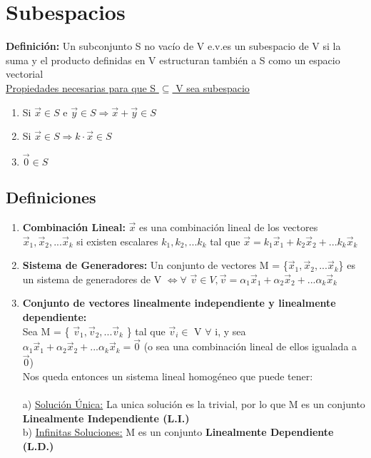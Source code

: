 \documentclass{article}
\begin{document}
\section{Subespacios} 
{\bfseries Definición:} Un subconjunto S no vacío de V e.v.es un subespacio de V si la suma y el producto definidas en  V estructuran también a S como un espacio vectorial \\
\underline {Propiedades necesarias para que S $\subseteq$ V sea subespacio}
\begin{enumerate}
\item Si $\vec{x} \in S$ e $\vec{y} \in S \Rightarrow \vec{x} + \vec{y} \in S$
\item Si $\vec{x} \in S \Rightarrow k \cdot \vec{x} \in S$
\item $\vec{0} \in S$
\end{enumerate}
\subsection{Definiciones}
\begin{enumerate}
\item {\bfseries Combinación Lineal:} $\vec{x}$ es una combinación lineal de los vectores $\vec{x}_{1}, \vec{x}_2,... \vec{x}_k $ si existen escalares $k_{1}, k_{2},... k_{k} $ tal que $\vec{x} = k_{1}\vec{x}_{1} + k_{2}\vec{x}_{2} +... k_{k}\vec{x}_{k}$
\item {\bfseries Sistema de Generadores:} Un conjunto de vectores M = \{$\vec{x}_{1}, \vec{x}_2,... \vec{x}_k $\} es un sistema de generadores de V $\Leftrightarrow \forall $ $ \vec{v} \in V, \vec{v} = \alpha_{1}\vec{x}_{1} + \alpha_{2}\vec{x}_{2} +... \alpha_{k}\vec{x}_{k}$
\item {\bfseries Conjunto de vectores linealmente independiente y linealmente dependiente:}\\
Sea M = \{ $\vec{v}_{1}, \vec{v}_2,... \vec{v}_k $ \} tal que $\vec{v}_{i} \in$ V $\forall $ i, y sea $\alpha_{1}\vec{x}_{1} + \alpha_{2}\vec{x}_{2} +... \alpha_{k}\vec{x}_{k} = \vec{0}$ (o sea una combinación lineal de ellos igualada a $\vec{0}$)\\
Nos queda entonces un sistema lineal homogéneo que puede tener:\\\\
a) \underline{Solución Única:} La unica solución es la trivial, por lo que M es un conjunto {\bfseries Linealmente Independiente (L.I.)}\\
b) \underline{Infinitas Soluciones:} M es un conjunto {\bfseries Linealmente Dependiente (L.D.)}
\end{enumerate}
\newpage
\end{document}
